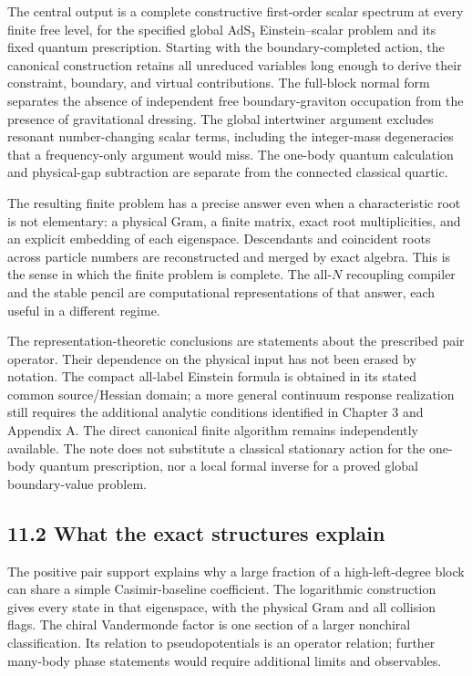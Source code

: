 The central output is a complete constructive first-order scalar spectrum at every finite free level, for the specified global AdS₃ Einstein--scalar problem and its fixed quantum prescription. Starting with the boundary-completed action, the canonical construction retains all unreduced variables long enough to derive their constraint, boundary, and virtual contributions. The full-block normal form separates the absence of independent free boundary-graviton occupation from the presence of gravitational dressing. The global intertwiner argument excludes resonant number-changing scalar terms, including the integer-mass degeneracies that a frequency-only argument would miss. The one-body quantum calculation and physical-gap subtraction are separate from the connected classical quartic.

The resulting finite problem has a precise answer even when a characteristic root is not elementary: a physical Gram, a finite matrix, exact root multiplicities, and an explicit embedding of each eigenspace. Descendants and coincident roots across particle numbers are reconstructed and merged by exact algebra. This is the sense in which the finite problem is complete. The all-\(N\) recoupling compiler and the stable pencil are computational representations of that answer, each useful in a different regime.

The representation-theoretic conclusions are statements about the prescribed pair operator. Their dependence on the physical input has not been erased by notation. The compact all-label Einstein formula is obtained in its stated common source/Hessian domain; a more general continuum response realization still requires the additional analytic conditions identified in Chapter 3 and Appendix A. The direct canonical finite algorithm remains independently available. The note does not substitute a classical stationary action for the one-body quantum prescription, nor a local formal inverse for a proved global boundary-value problem.

\hypertarget{what-the-exact-structures-explain}{%
\subsection{11.2 What the exact structures explain}\label{what-the-exact-structures-explain}}

The positive pair support explains why a large fraction of a high-left-degree block can share a simple Casimir-baseline coefficient. The logarithmic construction gives every state in that eigenspace, with the physical Gram and all collision flags. The chiral Vandermonde factor is one section of a larger nonchiral classification. Its relation to pseudopotentials is an operator relation; further many-body phase statements would require additional limits and observables.

